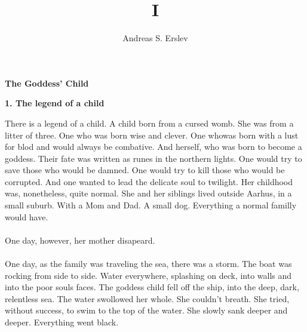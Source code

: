\documentclass[]{article}
\title{I}
\author{Andreas S. Erslev}
\begin{document}
	
\begin{center}
	\Large\textbf{The Goddess' Child}
\end{center}

\begin{center}
	\large\textbf{1. The legend of a child}
\end{center}

There is a legend of a child. A child born from a cursed womb. She was from a litter of three. One who was born wise and clever. One whowas born with a lust for blod and would always be combative. And herself, who was born to become a goddess. Their fate was written as runes in the northern lights. One would try to save those who would be damned. One would try to kill those who would be corrupted. And one wanted to lead the delicate soul to twilight. Her childhood was, nonetheless, quite normal. She and her siblings lived outside Aarhus, in a small suburb. With a Mom and Dad. A small dog. Everything a normal familly would have.
\\ \\
One day, however, her mother disapeard. 
\\ \\
One day, as the family was traveling the sea, there was a storm. The boat was rocking from side to side. Water everywhere, splashing on deck, into walls and into the poor souls faces. The goddess child fell off the ship, into the deep, dark, relentless sea. The water swollowed her whole. She couldn't breath. She tried, without success, to swim to the top of the water. She slowly sank deeper and deeper. Everything went black. 
\end{document}
